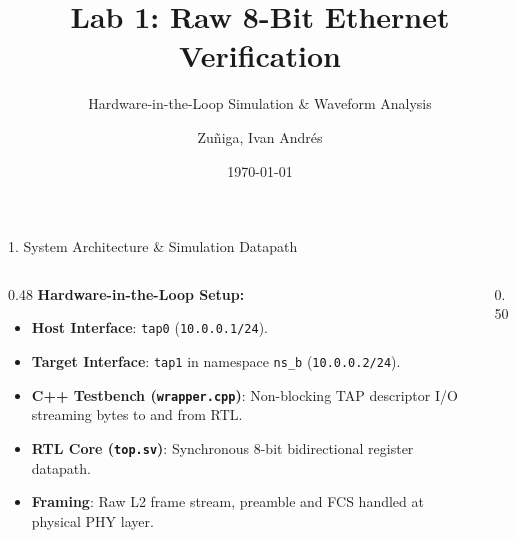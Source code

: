 \documentclass[aspectratio=169, 10pt]{beamer}
\title{Lab 1: Raw 8-Bit Ethernet Verification}
\subtitle{Hardware-in-the-Loop Simulation \& Waveform Analysis}
\date{\today}
\author{Zuñiga, Ivan Andrés}
\institute{Fundación Fulgor}
\begin{document}
\maketitle

\begin{frame}{1. System Architecture \& Simulation Datapath}
\begin{columns}[c]
    \begin{column}{0.48\textwidth}
        \textbf{Hardware-in-the-Loop Setup:}
        \begin{itemize}\small
            \item \textbf{Host Interface}: \texttt{tap0} (\texttt{10.0.0.1/24}).
            \item \textbf{Target Interface}: \texttt{tap1} in namespace \texttt{ns\_b} (\texttt{10.0.0.2/24}).
            \item \textbf{C++ Testbench (\texttt{wrapper.cpp})}: Non-blocking TAP descriptor I/O streaming bytes to and from RTL.
            \item \textbf{RTL Core (\texttt{top.sv})}: Synchronous 8-bit bidirectional register datapath.
            \item \textbf{Framing}: Raw L2 frame stream, preamble and FCS handled at physical PHY layer.
        \end{itemize}
    \end{column}
    
    \begin{column}{0.50\textwidth}
        \begin{tcolorbox}[colback=BgSlate, colframe=PrimaryBlue, title=\footnotesize Dataflow Architecture, arc=2mm, top=1.5mm, bottom=1.5mm]
            \centering
\end{tcolorbox}
\end{column}
\end{columns}
\end{frame}
\end{document}
